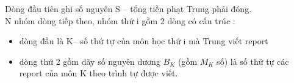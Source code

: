 Dòng đầu tiên ghi số nguyên S – tổng tiền phạt Trung phải đóng.
\\N nhóm dòng tiếp theo, nhóm thứ i gồm 2 dòng có cấu trúc :
\begin{itemize}
	\item dòng đầu là K– số thứ tự của môn học thứ i mà Trung viết report
	\item dòng thứ 2 gồm dãy số nguyên dương $B_{K}$ (gồm $M_{K}$ số) là số thứ tự các report của môn K theo trình tự được viết.
\end{itemize}